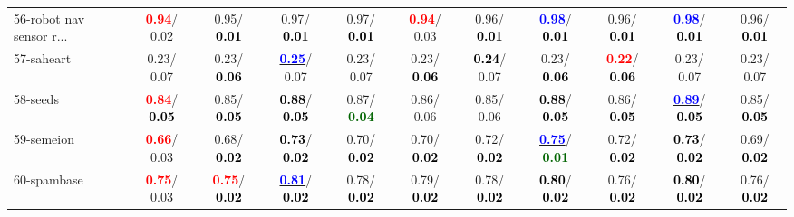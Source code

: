 \begin{table}[h]
\begin{center}
{\begin{tabular}{lc|c|c|c|c|c|c|c|c|c}
56-robot nav sensor r... & \textcolor{red}{\textbf{  0.94}}/  0.02 &   0.95/\textcolor{black}{\textbf{  0.01}} &   0.97/\textcolor{black}{\textbf{  0.01}} &   0.97/\textcolor{black}{\textbf{  0.01}} & \textcolor{red}{\textbf{  0.94}}/  0.03 &   0.96/\textcolor{black}{\textbf{  0.01}} & \textcolor{blue}{\textbf{  0.98}}/\textcolor{black}{\textbf{  0.01}} &   0.96/\textcolor{black}{\textbf{  0.01}} & \textcolor{blue}{\textbf{  0.98}}/\textcolor{black}{\textbf{  0.01}} &   0.96/\textcolor{black}{\textbf{  0.01}} \\
57-saheart &   0.23/  0.07 &   0.23/\textcolor{black}{\textbf{  0.06}} & \underline{\textcolor{blue}{\textbf{  0.25}}}/  0.07 &   0.23/  0.07 &   0.23/\textcolor{black}{\textbf{  0.06}} & \textcolor{black}{\textbf{  0.24}}/  0.07 &   0.23/\textcolor{black}{\textbf{  0.06}} & \textcolor{red}{\textbf{  0.22}}/\textcolor{black}{\textbf{  0.06}} &   0.23/  0.07 &   0.23/  0.07 \\
58-seeds & \textcolor{red}{\textbf{  0.84}}/\textcolor{black}{\textbf{  0.05}} &   0.85/\textcolor{black}{\textbf{  0.05}} & \textcolor{black}{\textbf{  0.88}}/\textcolor{black}{\textbf{  0.05}} &   0.87/\textcolor{darkgreen}{\textbf{  0.04}} &   0.86/  0.06 &   0.85/  0.06 & \textcolor{black}{\textbf{  0.88}}/\textcolor{black}{\textbf{  0.05}} &   0.86/\textcolor{black}{\textbf{  0.05}} & \underline{\textcolor{blue}{\textbf{  0.89}}}/\textcolor{black}{\textbf{  0.05}} &   0.85/\textcolor{black}{\textbf{  0.05}} \\
59-semeion & \textcolor{red}{\textbf{  0.66}}/  0.03 &   0.68/\textcolor{black}{\textbf{  0.02}} & \textcolor{black}{\textbf{  0.73}}/\textcolor{black}{\textbf{  0.02}} &   0.70/\textcolor{black}{\textbf{  0.02}} &   0.70/\textcolor{black}{\textbf{  0.02}} &   0.72/\textcolor{black}{\textbf{  0.02}} & \underline{\textcolor{blue}{\textbf{  0.75}}}/\textcolor{darkgreen}{\textbf{  0.01}} &   0.72/\textcolor{black}{\textbf{  0.02}} & \textcolor{black}{\textbf{  0.73}}/\textcolor{black}{\textbf{  0.02}} &   0.69/\textcolor{black}{\textbf{  0.02}} \\
60-spambase & \textcolor{red}{\textbf{  0.75}}/  0.03 & \textcolor{red}{\textbf{  0.75}}/\textcolor{black}{\textbf{  0.02}} & \underline{\textcolor{blue}{\textbf{  0.81}}}/\textcolor{black}{\textbf{  0.02}} &   0.78/\textcolor{black}{\textbf{  0.02}} &   0.79/\textcolor{black}{\textbf{  0.02}} &   0.78/\textcolor{black}{\textbf{  0.02}} & \textcolor{black}{\textbf{  0.80}}/\textcolor{black}{\textbf{  0.02}} &   0.76/\textcolor{black}{\textbf{  0.02}} & \textcolor{black}{\textbf{  0.80}}/\textcolor{black}{\textbf{  0.02}} &   0.76/\textcolor{black}{\textbf{  0.02}} \\ \hline

\end{tabular}}
\end{center}
\end{table}
